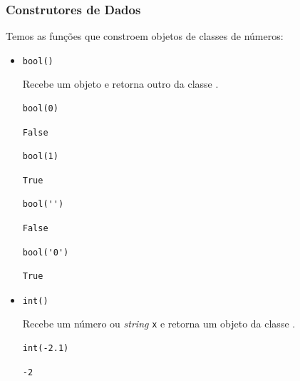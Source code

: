 \subsubsection{Construtores de Dados}

Temos as funções que constroem objetos de classes de números:
\begin{itemize}

\item \lstinline+bool()+ 

  Recebe um objeto e retorna outro da classe {\PYTHONbool}.

\begin{lstlisting}[xrightmargin=2.5em]
bool(0)
\end{lstlisting}

\begin{verbatim}
False  
\end{verbatim}


\begin{lstlisting}[xrightmargin=2.5em]
bool(1)
\end{lstlisting}

\begin{verbatim}
True
\end{verbatim}

\begin{lstlisting}[xrightmargin=2.5em]
bool('')
\end{lstlisting}

\begin{verbatim}
False
\end{verbatim}

\begin{lstlisting}[xrightmargin=2.5em]
bool('0')
\end{lstlisting}

\begin{verbatim}
True
\end{verbatim}
  
\item \lstinline+int()+ 

  Recebe um número ou \textit{string} \lstinline+x+ e retorna um objeto da classe {\PYTHONint}.

\begin{lstlisting}[xrightmargin=2.5em]
int(-2.1)
\end{lstlisting}

\begin{verbatim}
-2
\end{verbatim}


\end{itemize}
